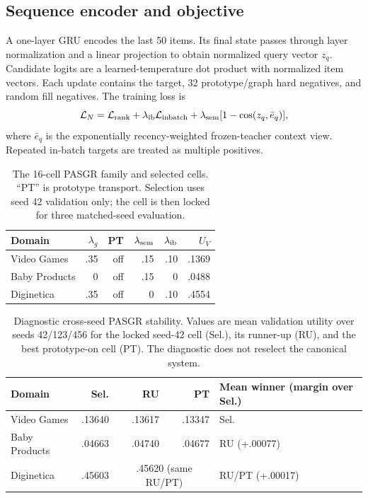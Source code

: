 \documentclass[runningheads]{llncs}
\begin{document}
\subsection{Sequence encoder and objective}
A one-layer GRU encodes the last 50 items. Its final state passes through layer
normalization and a linear projection to obtain normalized query vector $z_q$.
Candidate logits are a learned-temperature dot product with normalized item
vectors. Each update contains the target, 32 prototype/graph hard negatives,
and random fill negatives. The training loss is
\[
\mathcal L_N=\mathcal L_{\rm rank}
+\lambda_{\rm ib}\mathcal L_{\rm inbatch}
+\lambda_{\rm sem}[1-\cos(z_q,\bar e_q)],
\]
where $\bar e_q$ is the exponentially recency-weighted frozen-teacher context
view. Repeated in-batch targets are treated as multiple positives.

\begin{table}[t]
\caption{The 16-cell PASGR family and selected cells. ``PT'' is prototype
transport. Selection uses seed 42 validation only; the cell is then locked for
three matched-seed evaluation.}
\centering
\begin{tabular}{lrrrrr}
\toprule
Domain & $\lambda_g$ & PT & $\lambda_{\rm sem}$ &
$\lambda_{\rm ib}$ & $U_V$\\
\midrule
Video Games & .35 & off & .15 & .10 & .1369\\
Baby Products & 0 & off & .15 & 0 & .0488\\
Diginetica & .35 & off & 0 & .10 & .4554\\
\bottomrule
\end{tabular}
\end{table}

\begin{table}[t]
\caption{Diagnostic cross-seed PASGR stability. Values are mean validation
utility over seeds 42/123/456 for the locked seed-42 cell (Sel.), its runner-up
(RU), and the best prototype-on cell (PT). The diagnostic does not reselect the
canonical system.}
\centering
\begin{tabular}{lrrrl}
\toprule
Domain & Sel. & RU & PT & Mean winner (margin over Sel.)\\
\midrule
Video Games & .13640 & .13617 & .13347 & Sel.\\
Baby Products & .04663 & .04740 & .04677 & RU (+.00077)\\
Diginetica & .45603 & \multicolumn{2}{c}{.45620 (same RU/PT)} & RU/PT (+.00017)\\
\bottomrule
\end{tabular}
\end{table}
\end{document}
